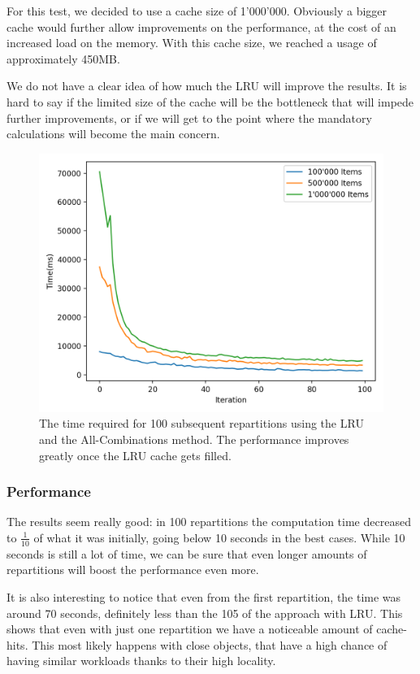 For this test, we decided to use a cache size of 1'000'000. Obviously a bigger cache would further allow improvements on the performance, at the cost of an increased load on the memory. With this cache size, we reached a usage of approximately 450MB.

We do not have a clear idea of how much the LRU will improve the results. It is hard to say if the limited size of the cache will be the bottleneck that will impede further improvements, or if we will get to the point where the mandatory calculations will become the main concern.

\begin{figure}[!htb]
  \centering
  \includegraphics[width=\textwidth,height=\textheight,keepaspectratio]{img/LRU_8.png}
  \caption{The time required for 100 subsequent repartitions using the LRU and the All-Combinations method. The performance improves greatly once the LRU cache gets filled. }
  \label{fig:LRU_8}
\end{figure}

\subsubsection{Performance}
The results seem really good: in 100 repartitions the computation time decreased to $\frac{1}{10}$ of what it was initially, going below 10 seconds in the best cases. While 10 seconds is still a lot of time, we can be sure that even longer amounts of repartitions will boost the performance even more. 

It is also interesting to notice that even from the first repartition, the time was around 70 seconds, definitely less than the 105 of the approach with LRU. This shows that even with just one repartition we have a noticeable amount of cache-hits. This most likely happens with close objects, that have a high chance of having similar workloads thanks to their high locality.

